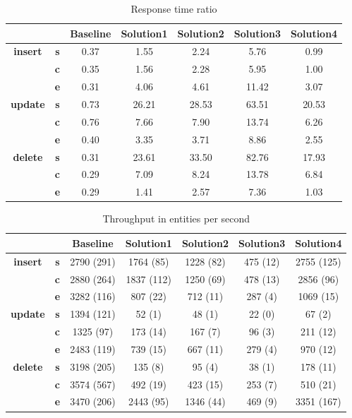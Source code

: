\begin{table}[h]
\centering
\caption{Response time ratio}\label{t:}
\begin{tabular}{ccccccc}
\toprule
&&\textbf{Baseline} & \textbf{Solution1} & \textbf{Solution2} & \textbf{Solution3} & \textbf{Solution4}\\
\midrule
\multirow{3}{*}{\textbf{insert}} & \textbf{s} & 0.37 & 1.55 & 2.24 & 5.76 & 0.99\\
 & \textbf{c} & 0.35 & 1.56 & 2.28 & 5.95 & 1.00\\
 & \textbf{e} & 0.31 & 4.06 & 4.61 & 11.42 & 3.07\\
\midrule
\multirow{3}{*}{\textbf{update}} & \textbf{s} & 0.73 & 26.21 & 28.53 & 63.51 & 20.53\\
 & \textbf{c} & 0.76 & 7.66 & 7.90 & 13.74 & 6.26\\
 & \textbf{e} & 0.40 & 3.35 & 3.71 & 8.86 & 2.55\\
\midrule
\multirow{3}{*}{\textbf{delete}} & \textbf{s} & 0.31 & 23.61 & 33.50 & 82.76 & 17.93\\
 & \textbf{c} & 0.29 & 7.09 & 8.24 & 13.78 & 6.84\\
 & \textbf{e} & 0.29 & 1.41 & 2.57 & 7.36 & 1.03\\
\bottomrule
\end{tabular}
\end{table}






\begin{table}[h]
\centering
\caption{Throughput in entities per second}\label{t:}
\begin{tabular}{ccccccc}
\toprule
&&\textbf{Baseline} & \textbf{Solution1} & \textbf{Solution2} & \textbf{Solution3} & \textbf{Solution4}\\
\midrule
\multirow{3}{*}{\textbf{insert}} & \textbf{s} & 2790 (291) & 1764 (85) & 1228 (82) & 475 (12) & 2755 (125)\\
 & \textbf{c} & 2880 (264) & 1837 (112) & 1250 (69) & 478 (13) & 2856 (96)\\
 & \textbf{e} & 3282 (116) & 807 (22) & 712 (11) & 287 (4) & 1069 (15)\\
\midrule
\multirow{3}{*}{\textbf{update}} & \textbf{s} & 1394 (121) & 52 (1) & 48 (1) & 22 (0) & 67 (2)\\
 & \textbf{c} & 1325 (97) & 173 (14) & 167 (7) & 96 (3) & 211 (12)\\
 & \textbf{e} & 2483 (119) & 739 (15) & 667 (11) & 279 (4) & 970 (12)\\
\midrule
\multirow{3}{*}{\textbf{delete}} & \textbf{s} & 3198 (205) & 135 (8) & 95 (4) & 38 (1) & 178 (11)\\
 & \textbf{c} & 3574 (567) & 492 (19) & 423 (15) & 253 (7) & 510 (21)\\
 & \textbf{e} & 3470 (206) & 2443 (95) & 1346 (44) & 469 (9) & 3351 (167)\\
\bottomrule
\end{tabular}
\end{table}



